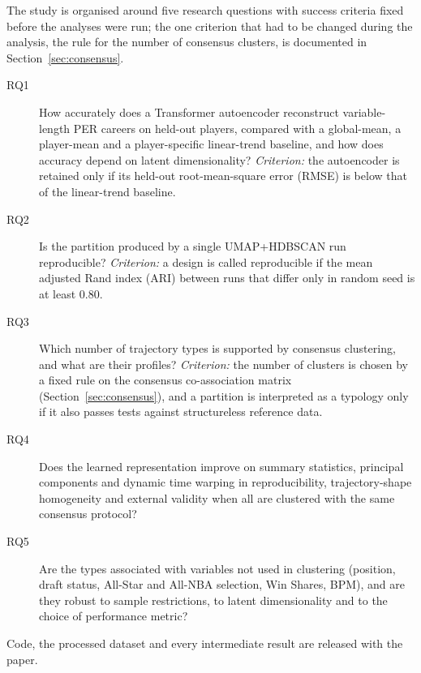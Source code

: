 The study is organised around five research questions with success criteria fixed before the analyses were run; the one criterion that had to be changed during the analysis, the rule for the number of consensus clusters, is documented in Section~\ref{sec:consensus}.
\begin{description}
\item[RQ1] How accurately does a Transformer autoencoder reconstruct variable-length PER careers on held-out players, compared with a global-mean, a player-mean and a player-specific linear-trend baseline, and how does accuracy depend on latent dimensionality? \emph{Criterion:} the autoencoder is retained only if its held-out root-mean-square error (RMSE) is below that of the linear-trend baseline.
\item[RQ2] Is the partition produced by a single UMAP+HDBSCAN run reproducible? \emph{Criterion:} a design is called reproducible if the mean adjusted Rand index (ARI) between runs that differ only in random seed is at least $0.80$.
\item[RQ3] Which number of trajectory types is supported by consensus clustering, and what are their profiles? \emph{Criterion:} the number of clusters is chosen by a fixed rule on the consensus co-association matrix (Section~\ref{sec:consensus}), and a partition is interpreted as a typology only if it also passes tests against structureless reference data.
\item[RQ4] Does the learned representation improve on summary statistics, principal components and dynamic time warping in reproducibility, trajectory-shape homogeneity and external validity when all are clustered with the same consensus protocol?
\item[RQ5] Are the types associated with variables not used in clustering (position, draft status, All-Star and All-NBA selection, Win Shares, BPM), and are they robust to sample restrictions, to latent dimensionality and to the choice of performance metric?
\end{description}

Code, the processed dataset and every intermediate result are released with the paper.
